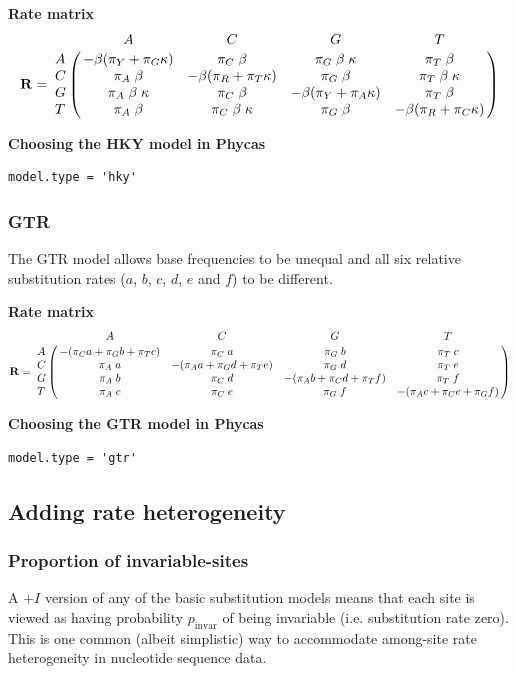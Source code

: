 \documentclass[10pt]{article}
\newcommand{\pinvar}{\mbox{$p_{\mbox{invar}}$}}
\begin{document}
{\bf Rate matrix}
$${\bf R} = \bordermatrix{ &       A      &       C       &       G       &       T       \cr
A & -\beta (\pi_Y + \pi_G \kappa) & \pi_C \; \beta  & \pi_G \; \beta \; \kappa  & \pi_T \; \beta  \cr
C & \pi_A \; \beta & -\beta (\pi_R + \pi_T \kappa) & \pi_G \; \beta  & \pi_T \; \beta \; \kappa  \cr
G & \pi_A \; \beta \; \kappa & \pi_C \; \beta  & -\beta (\pi_Y + \pi_A \kappa) & \pi_T \; \beta  \cr
T & \pi_A \; \beta & \pi_C \; \beta \; \kappa  & \pi_G \; \beta  & -\beta (\pi_R + \pi_C \kappa) \cr}$$

{\bf Choosing the HKY model in Phycas}
\begin{verbatim}
model.type = 'hky'
\end{verbatim}

\subsubsection{GTR}
The GTR model \citep{LanavePreparataSacconeSerio1984} allows base frequencies to be unequal and all six relative substitution rates ($a$, $b$, $c$, $d$, $e$ and $f$) to be different.

{\bf Rate matrix}
$${\bf R} = \bordermatrix{ &       A      &       C       &       G       &       T       \cr
A & -(\pi_C a + \pi_G b + \pi_T c) & \pi_C \; a  & \pi_G \; b  & \pi_T \; c  \cr
C & \pi_A \; a & -(\pi_A a + \pi_G d + \pi_T e) & \pi_G \; d  & \pi_T \; e  \cr
G & \pi_A \; b & \pi_C \; d  & -(\pi_A b + \pi_C d + \pi_T f) & \pi_T \; f  \cr
T & \pi_A \; c & \pi_C \; e  & \pi_G \; f  & -(\pi_A c + \pi_C e + \pi_G f) \cr}$$

{\bf Choosing the GTR model in Phycas}
\begin{verbatim}
model.type = 'gtr'
\end{verbatim}

\subsection{Adding rate heterogeneity}

\subsubsection{Proportion of invariable-sites}
A $+I$ version \citep{Reeves1992} of any of the basic substitution models means that each site is viewed as having probability $\pinvar$ of being invariable (i.e. substitution rate zero). This is one common (albeit simplistic) way to accommodate among-site rate heterogeneity in nucleotide sequence data.
\end{document}
